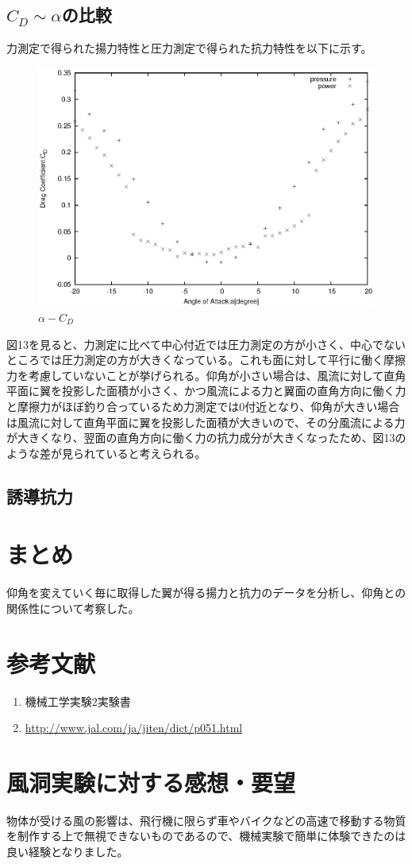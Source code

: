 \documentclass[a4j,twoside,openright,11pt]{jarticle}
\begin{document}
\subsection{$C_D \sim \alpha$の比較}
力測定で得られた揚力特性と圧力測定で得られた抗力特性を以下に示す。
\begin{figure}[]
\begin{center}
\includegraphics[width=12cm]{./2-CL-CD/CD2.eps}
\end{center}
\caption{$\alpha-C_D$}
\end{figure}
図13を見ると、力測定に比べて中心付近では圧力測定の方が小さく、中心でないところでは圧力測定の方が大きくなっている。これも面に対して平行に働く摩擦力を考慮していないことが挙げられる。仰角が小さい場合は、風流に対して直角平面に翼を投影した面積が小さく、かつ風流による力と翼面の直角方向に働く力と摩擦力がほぼ釣り合っているため力測定では0付近となり、仰角が大きい場合は風流に対して直角平面に翼を投影した面積が大きいので、その分風流による力が大きくなり、翌面の直角方向に働く力の抗力成分が大きくなったため、図13のような差が見られていると考えられる。

\subsection{誘導抗力}


\section{まとめ}
仰角を変えていく毎に取得した翼が得る揚力と抗力のデータを分析し、仰角との関係性について考察した。

\section{参考文献}
\begin{enumerate}
\item 機械工学実験2実験書
\item \url{http://www.jal.com/ja/jiten/dict/p051.html}
\end{enumerate}

\section{風洞実験に対する感想・要望}
物体が受ける風の影響は、飛行機に限らず車やバイクなどの高速で移動する物質を制作する上で無視できないものであるので、機械実験で簡単に体験できたのは良い経験となりました。
\end{document}
